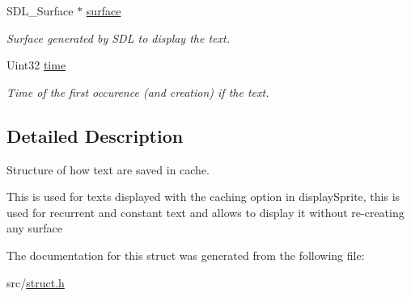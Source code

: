 \begin{DoxyCompactItemize}
\mbox{\label{struct_text_cache_a3117e686a8bf9c422283a65262678605}} 
S\+D\+L\+\_\+\+Surface $\ast$ \hyperlink{struct_text_cache_a3117e686a8bf9c422283a65262678605}{surface}
\begin{DoxyCompactList}\small\item\em Surface generated by S\+DL to display the text. \end{DoxyCompactList}\item 
\mbox{\label{struct_text_cache_ad9219d2e8e209779398a17f70b779150}} 
Uint32 \hyperlink{struct_text_cache_ad9219d2e8e209779398a17f70b779150}{time}
\begin{DoxyCompactList}\small\item\em Time of the first occurence (and creation) if the text. \end{DoxyCompactList}\end{DoxyCompactItemize}


\subsection{Detailed Description}
Structure of how text are saved in cache. 

This is used for texts displayed with the caching option in display\+Sprite, this is used for recurrent and constant text and allows to display it without re-\/creating any surface 

The documentation for this struct was generated from the following file\+:\begin{DoxyCompactItemize}
\item 
src/\hyperlink{struct_8h}{struct.\+h}\end{DoxyCompactItemize}
